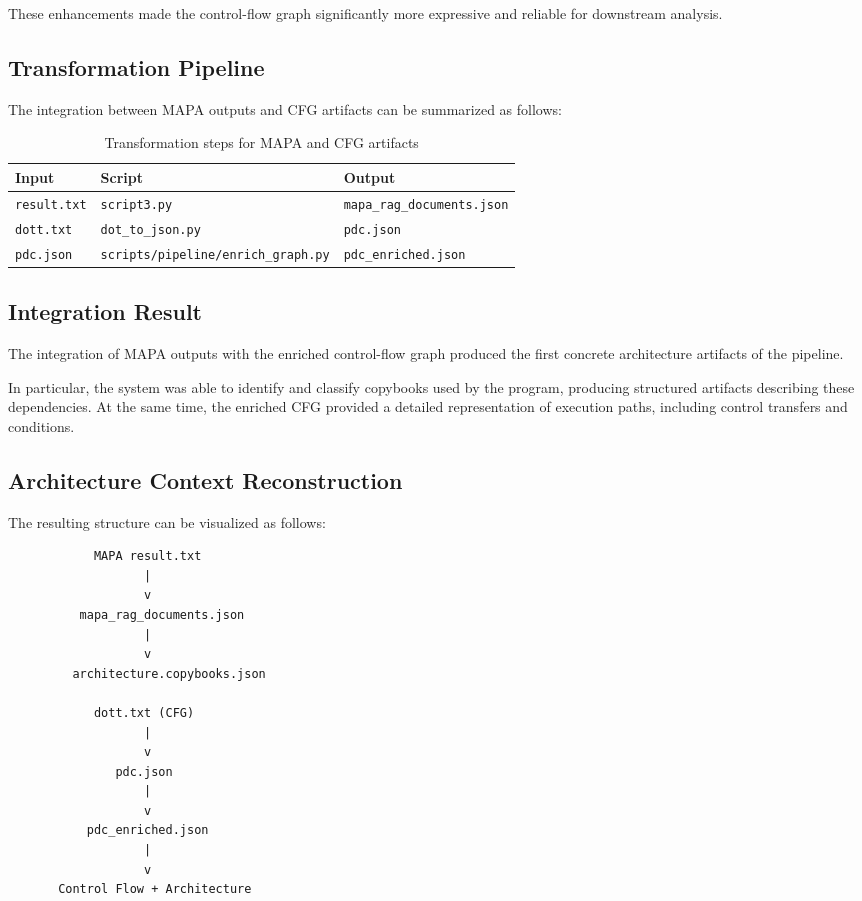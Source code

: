 \documentclass[11pt]{article}
\begin{document}
These enhancements made the control-flow graph significantly more expressive and reliable for downstream analysis.

\subsection*{Transformation Pipeline}

The integration between MAPA outputs and CFG artifacts can be summarized as follows:

\begin{table}[h]
\centering
\begin{tabular}{|l|l|l|}
\hline
\textbf{Input} & \textbf{Script} & \textbf{Output} \\
\hline
\texttt{result.txt} & \texttt{script3.py} & \texttt{mapa\_rag\_documents.json} \\
\hline
\texttt{dott.txt} & \texttt{dot\_to\_json.py} & \texttt{pdc.json} \\
\hline
\texttt{pdc.json} & \texttt{scripts/pipeline/enrich\_graph.py} & \texttt{pdc\_enriched.json} \\
\hline
\end{tabular}
\caption{Transformation steps for MAPA and CFG artifacts}
\end{table}

\subsection*{Integration Result}

The integration of MAPA outputs with the enriched control-flow graph produced the first concrete architecture artifacts of the pipeline.

In particular, the system was able to identify and classify copybooks used by the program, producing structured artifacts describing these dependencies. At the same time, the enriched CFG provided a detailed representation of execution paths, including control transfers and conditions.

\subsection*{Architecture Context Reconstruction}

The resulting structure can be visualized as follows:

\begin{center}
\begin{verbatim}
            MAPA result.txt
                   |
                   v
          mapa_rag_documents.json
                   |
                   v
         architecture.copybooks.json

            dott.txt (CFG)
                   |
                   v
               pdc.json
                   |
                   v
           pdc_enriched.json
                   |
                   v
       Control Flow + Architecture
\end{verbatim}
\end{center}
\end{document}
